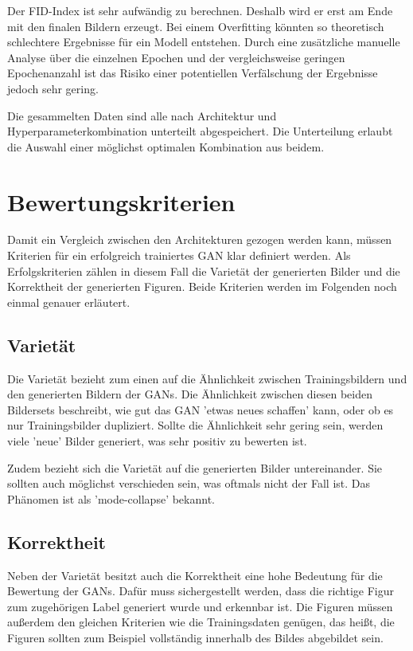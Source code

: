 Der \acrshort{FID}-Index ist sehr aufwändig zu berechnen.
Deshalb wird er erst am Ende mit den finalen Bildern erzeugt.
Bei einem Overfitting könnten so theoretisch schlechtere Ergebnisse für ein Modell entstehen.
Durch eine zusätzliche manuelle Analyse über die einzelnen Epochen und der vergleichsweise geringen Epochenanzahl ist das Risiko einer potentiellen Verfälschung der Ergebnisse jedoch sehr gering.
\newline

Die gesammelten Daten sind alle nach Architektur und Hyperparameterkombination unterteilt abgespeichert.
Die Unterteilung erlaubt die Auswahl einer möglichst optimalen Kombination aus beidem.

\section{Bewertungskriterien}
Damit ein Vergleich zwischen den Architekturen gezogen werden kann, müssen Kriterien für ein erfolgreich trainiertes GAN klar definiert werden.
Als Erfolgskriterien zählen in diesem Fall die Varietät der generierten Bilder und die Korrektheit der generierten Figuren.
Beide Kriterien werden im Folgenden noch einmal genauer erläutert.

\subsection{Varietät}
Die Varietät bezieht zum einen auf die Ähnlichkeit zwischen Trainingsbildern und den generierten Bildern der GANs.
Die Ähnlichkeit zwischen diesen beiden Bildersets beschreibt, wie gut das GAN 'etwas neues schaffen' kann, oder ob es nur Trainingsbilder dupliziert.
Sollte die Ähnlichkeit sehr gering sein, werden viele 'neue' Bilder generiert, was sehr positiv zu bewerten ist.
\newline

Zudem bezieht sich die Varietät auf die generierten Bilder untereinander.
Sie sollten auch möglichst verschieden sein, was oftmals nicht der Fall ist.
Das Phänomen ist als 'mode-collapse' bekannt. 

\subsection{Korrektheit}
Neben der Varietät besitzt auch die Korrektheit eine hohe Bedeutung für die Bewertung der GANs.
Dafür muss sichergestellt werden, dass die richtige Figur zum zugehörigen Label generiert wurde und erkennbar ist.
Die Figuren müssen außerdem den gleichen Kriterien wie die Trainingsdaten genügen, das heißt, die Figuren sollten zum Beispiel vollständig innerhalb des Bildes abgebildet sein.
\newline

